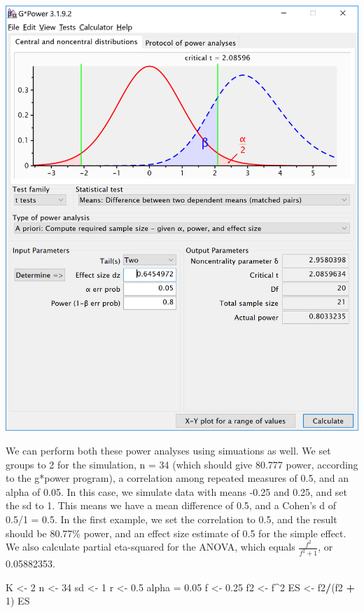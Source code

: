 \documentclass[]{book}
\newenvironment{Shaded}{\begin{snugshade}}{\end{snugshade}}
\newcommand{\DecValTok}[1]{\textcolor[rgb]{0.00,0.00,0.81}{#1}}
\newcommand{\FloatTok}[1]{\textcolor[rgb]{0.00,0.00,0.81}{#1}}
\newcommand{\NormalTok}[1]{#1}
\newcommand{\OperatorTok}[1]{\textcolor[rgb]{0.81,0.36,0.00}{\textbf{#1}}}
\newcommand{\StringTok}[1]{\textcolor[rgb]{0.31,0.60,0.02}{#1}}
\begin{document}
\includegraphics{screenshots/gpower_10.png}

We can perform both these power analyses using simuations as well. We set groups to 2 for the simulation, n = 34 (which should give 80.777 power, according to the g*power program), a correlation among repeated measures of 0.5, and an alpha of 0.05. In this case, we simulate data with means -0.25 and 0.25, and set the sd to 1. This means we have a mean difference of 0.5, and a Cohen's d of 0.5/1 = 0.5. In the first example, we set the correlation to 0.5, and the result should be 80.77\% power, and an effect size estimate of 0.5 for the simple effect. We also calculate partial eta-squared for the ANOVA, which equals \(\frac{f^2}{f^2+1}\), or 0.05882353.

\begin{Shaded}
\begin{Highlighting}[]
\NormalTok{K <-}\StringTok{ }\DecValTok{2}
\NormalTok{n <-}\StringTok{ }\DecValTok{34}
\NormalTok{sd <-}\StringTok{ }\DecValTok{1}
\NormalTok{r <-}\StringTok{ }\FloatTok{0.5}
\NormalTok{alpha =}\StringTok{ }\FloatTok{0.05}
\NormalTok{f <-}\StringTok{ }\FloatTok{0.25}
\NormalTok{f2 <-}\StringTok{ }\NormalTok{f}\OperatorTok{^}\DecValTok{2}
\NormalTok{ES <-}\StringTok{ }\NormalTok{f2}\OperatorTok{/}\NormalTok{(f2 }\OperatorTok{+}\StringTok{ }\DecValTok{1}\NormalTok{)}
\NormalTok{ES}
\end{Highlighting}
\end{Shaded}
\end{document}
